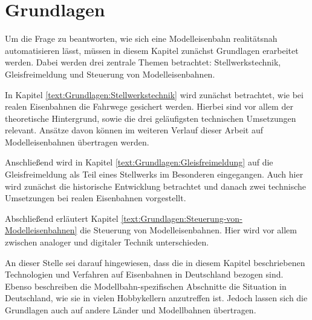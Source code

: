 \chapter{Grundlagen}\label{text:Grundlagen}

Um die Frage zu beantworten, wie sich eine Modelleisenbahn realitätsnah automatisieren lässt, müssen in diesem Kapitel zunächst Grundlagen erarbeitet werden. Dabei werden drei zentrale Themen betrachtet: Stellwerkstechnik, Gleisfreimeldung und Steuerung von Modelleisenbahnen.

In Kapitel \autoref{text:Grundlagen:Stellwerkstechnik}  wird zunächst betrachtet, wie bei realen Eisenbahnen die Fahrwege gesichert werden. Hierbei sind vor allem der theoretische Hintergrund, sowie die drei geläufigsten technischen Umsetzungen relevant. Ansätze davon können im weiteren Verlauf dieser Arbeit auf Modelleisenbahnen übertragen werden.

Anschließend wird in Kapitel \autoref{text:Grundlagen:Gleisfreimeldung}  auf die Gleisfreimeldung als Teil eines Stellwerks im Besonderen eingegangen. Auch hier wird zunächst die historische Entwicklung betrachtet und danach zwei technische Umsetzungen bei realen Eisenbahnen vorgestellt.

Abschließend erläutert Kapitel \autoref{text:Grundlagen:Steuerung-von-Modelleisenbahnen}  die Steuerung von Modelleisenbahnen. Hier wird vor allem zwischen analoger und digitaler Technik unterschieden.

An dieser Stelle sei darauf hingewiesen, dass die in diesem Kapitel beschriebenen Technologien und Verfahren auf Eisenbahnen in Deutschland bezogen sind. Ebenso beschreiben die Modellbahn-spezifischen Abschnitte die Situation in Deutschland, wie sie in vielen Hobbykellern anzutreffen ist. Jedoch lassen sich die Grundlagen auch auf andere Länder und Modellbahnen übertragen.




